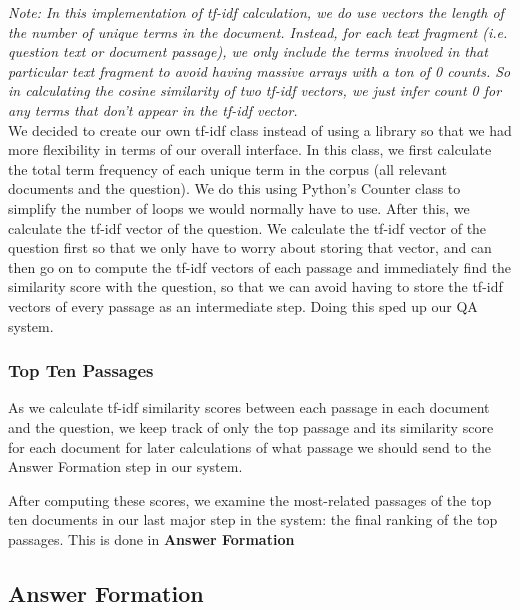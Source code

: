 \documentclass{article}
\begin{document}
\textit{Note: In this implementation of tf-idf calculation, we do use vectors the length of the number of unique terms in the document. Instead, for each text fragment (i.e. question text or document passage), we only include the terms involved in that particular text fragment to avoid having massive arrays with a ton of 0 counts. So in calculating the cosine similarity of two tf-idf vectors, we just infer count 0 for any terms that don't appear in the tf-idf vector.}\\

We decided to create our own tf-idf class instead of using a library so that we had more flexibility in terms of our overall interface. In this class, we first calculate the total term frequency of each unique term in the corpus (all relevant documents and the question). We do this using Python's Counter class to simplify the number of loops we would normally have to use. After this, we calculate the tf-idf vector of the question. We calculate the tf-idf vector of the question first so that we only have to worry about storing that vector, and can then go on to compute the tf-idf vectors of each passage and immediately find the similarity score with the question, so that we can avoid having to store the tf-idf vectors of every passage as an intermediate step. Doing this sped up our QA system.

\subsubsection{Top Ten Passages}
As we calculate tf-idf similarity scores between each passage in each document and the question, we keep track of only the top passage and its similarity score for each document for later calculations of what passage we should send to the Answer Formation step in our system.

After computing these scores, we examine the most-related passages of the top ten documents in our last major step in the system: the final ranking of the top passages. This is done in \textbf{Answer Formation}

\subsection{Answer Formation}
\end{document}
